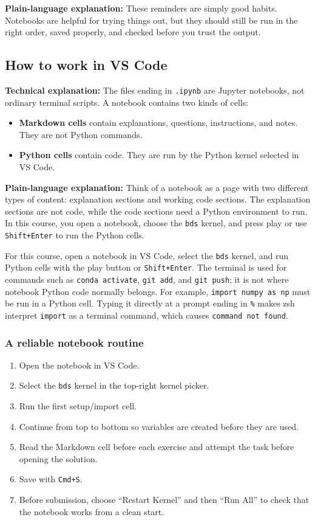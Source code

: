 \documentclass[11pt,a4paper]{article}
\begin{document}
\textbf{Plain-language explanation:} These reminders are simply good habits. Notebooks are helpful for trying things out, but they should still be run in the right order, saved properly, and checked before you trust the output.

\subsection{How to work in VS Code}
\textbf{Technical explanation:} The files ending in \texttt{.ipynb} are Jupyter notebooks, not ordinary terminal scripts. A notebook contains two kinds of cells:

\begin{itemize}[leftmargin=1.5em]
    \item \textbf{Markdown cells} contain explanations, questions, instructions, and notes. They are not Python commands.
    \item \textbf{Python cells} contain code. They are run by the Python kernel selected in VS Code.
\end{itemize}

\textbf{Plain-language explanation:} Think of a notebook as a page with two different types of content: explanation sections and working code sections. The explanation sections are not code, while the code sections need a Python environment to run. In this course, you open a notebook, choose the \texttt{bds} kernel, and press play or use \texttt{Shift+Enter} to run the Python cells.

For this course, open a notebook in VS Code, select the \texttt{bds} kernel, and run Python cells with the play button or \texttt{Shift+Enter}. The terminal is used for commands such as \texttt{conda activate}, \texttt{git add}, and \texttt{git push}; it is not where notebook Python code normally belongs. For example, \texttt{import numpy as np} must be run in a Python cell. Typing it directly at a prompt ending in \texttt{\%} makes zsh interpret \texttt{import} as a terminal command, which causes \texttt{command not found}.

\subsubsection{A reliable notebook routine}
\begin{enumerate}[leftmargin=1.8em]
    \item Open the notebook in VS Code.
    \item Select the \texttt{bds} kernel in the top-right kernel picker.
    \item Run the first setup/import cell.
    \item Continue from top to bottom so variables are created before they are used.
    \item Read the Markdown cell before each exercise and attempt the task before opening the solution.
    \item Save with \texttt{Cmd+S}.
    \item Before submission, choose ``Restart Kernel'' and then ``Run All'' to check that the notebook works from a clean start.
\end{enumerate}
\end{document}
